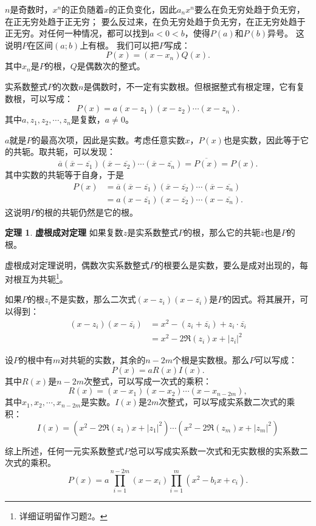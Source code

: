 \documentclass[12pt,UTF8]{ctexbook}
\theoremstyle{definition}
\newtheorem{tm}{定理}[section]
\theoremstyle{plain}
\begin{document}
\begin{appendix}
$n$是奇数时，$x^n$的正负随着$x$的正负变化，因此$a_nx^n$要么在负无穷处趋于负无穷，在正无穷处趋于正无穷；
要么反过来，在负无穷处趋于负无穷，在正无穷处趋于正无穷。对任何一种情况，都可以找到$a<0<b$，使得$P(a)$和$P(b)$异号。
这说明$P$在区间$(a;b)$上有根。
我们可以把$P$写成：
$$ P(x) = (x - x_n)Q(x).$$
其中$x_n$是$P$的根，$Q$是偶数次的整式。

实系数整式$P$的次数$n$是偶数时，不一定有实数根。但根据整式有根定理，它有复数根，可以写成：
$$ P(x) = a(x - z_1)(x - z_2)\cdots(x - z_n).$$
其中$a, z_1, z_2,\cdots, z_n$是复数，$a\neq 0$。

$a$就是$P$的最高次项，因此是实数。考虑任意实数$x$，$P(x)$也是实数，因此等于它的共轭。取共轭，可以发现：
$$ \overline{a}(\overline{x} - \overline{z_1})(\overline{x} - \overline{z_2})\cdots(\overline{x} - \overline{z_n}) = \overline{P(x)} = P(x).$$
其中实数的共轭等于自身，于是
\begin{align*}
    P(x) &= \overline{a}(\overline{x} - \overline{z_1})(\overline{x} - \overline{z_2})\cdots(\overline{x} - \overline{z_n}) \\
    &= a(x - \overline{z_1})(x - \overline{z_2})\cdots(x - \overline{z_n}). 
\end{align*}
这说明$P$的根的共轭仍然是它的根。
\begin{tm}{\textbf{虚根成对定理}}
    如果复数$z$是实系数整式$P$的根，那么它的共轭$\overline{z}$也是$P$的根。
\end{tm}
虚根成对定理说明，偶数次实系数整式$P$的根要么是实数，要么是成对出现的，每对根互为共轭\footnote{详细证明留作习题2。}。
  
如果$P$的根$z_i$不是实数，那么二次式$(x - z_i)(x - \overline{z_i})$是$P$的因式。将其展开，可以得到：
\begin{align*}
    (x - z_i)(x - \overline{z_i}) &= x^2 - (z_i + \overline{z_i}) + z_i\cdot\overline{z_i} \\
    &= x^2 - 2\Re(z_i)x + |z_i|^2
\end{align*}

设$P$的根中有$m$对共轭的实数，其余的$n-2m$个根是实数根。那么$P$可以写成：
$$ P(x) = aR(x)I(x).$$
其中$R(x)$是$n-2m$次整式，可以写成一次式的乘积：
$$ R(x) = (x - x_1)(x - x_2)\cdots(x - x_{n-2m}), $$
其中$x_1, x_2, \cdots, x_{n-2m}$是实数。$I(x)$是$2m$次整式，可以写成实系数二次式的乘积：
$$ I(x) = (x^2 - 2\Re(z_1)x + |z_1|^2) \cdots (x^2 - 2\Re(z_m)x + |z_m|^2)$$

综上所述，任何一元实系数整式$P$总可以写成实系数一次式和无实数根的实系数二次式的乘积。
$$ P(x) = a\prod_{i=1}^{n-2m}(x - x_i) \prod_{i=1}^m (x^2 - b_ix + c_i). $$


\end{appendix}
\end{document}
